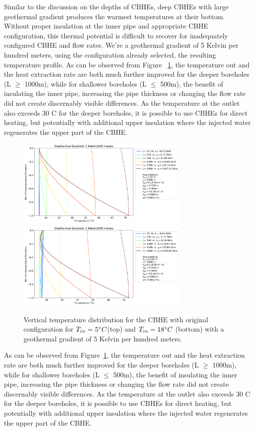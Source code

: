 		Similar to the discussion on the depths of CBHEs, deep CBHEs with large geothermal gradient produces the warmest temperatures at their bottom. Without proper insulation at the inner pipe and appropriate CBHE configuration, this thermal potential is difficult to recover for inadequately configured CBHE and flow rates. We're a geothermal gradient of 5 Kelvin per hundred meters, using the configuration already selected, the resulting temperature profile. As can be observed from Figure ~\ref{fig:5K}, the temperature out and the heat extraction rate are both much further improved for the deeper boreholes (L $\geq$ 1000m), while for shallower boreholes (L $\leq$ 500m), the benefit of insulating the inner pipe, increasing the pipe thickness or changing the flow rate did not create discernably visible differences. As the temperature at the outlet also exceeds 30 \degree C for the deeper boreholes, it is possible to use CBHEs for direct heating, but potentially with additional upper insulation where the injected water regenerates the upper part of the CBHE.
	    \begin{figure}[h!]
	        \centering
	        \includegraphics[width=0.75\textwidth]{depths_5_5k_Tin5_w3.png}
	        \includegraphics[width=0.75\textwidth]{depths_5_5k_Tin18_w3.png}
	        \caption{Vertical temperature distribution for the CBHE with original configuration for $T_{in} = 5\degree C$(top) and $T_{in} = 18\degree C$ (bottom) with a geothermal gradient of 5 Kelvin per hundred meters.}
	        \label{fig:5K}
	    \end{figure}
	    As can be observed from Figure~\ref{fig:5K}, the temperature out and the heat extraction rate are both much further improved for the deeper boreholes (L $\geq$ 1000m), while for shallower boreholes (L $\leq$ 500m), the benefit of insulating the inner pipe, increasing the pipe thickness or changing the flow rate did not create discernably visible differences. As the temperature at the outlet also exceeds 30 \degree C for the deeper boreholes, it is possible to use CBHEs for direct heating, but potentially with additional upper insulation where the injected water regenerates the upper part of the CBHE.    

